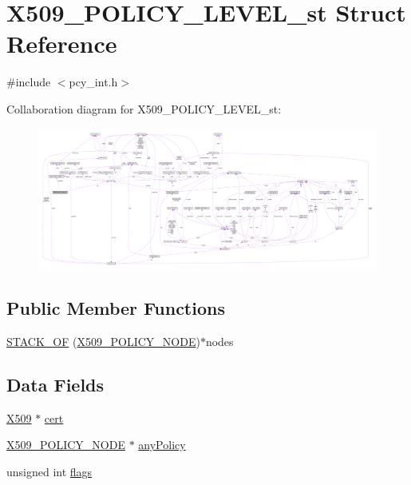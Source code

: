 \hypertarget{struct_x509___p_o_l_i_c_y___l_e_v_e_l__st}{}\section{X509\+\_\+\+P\+O\+L\+I\+C\+Y\+\_\+\+L\+E\+V\+E\+L\+\_\+st Struct Reference}
\label{struct_x509___p_o_l_i_c_y___l_e_v_e_l__st}


{\ttfamily \#include $<$pcy\+\_\+int.\+h$>$}



Collaboration diagram for X509\+\_\+\+P\+O\+L\+I\+C\+Y\+\_\+\+L\+E\+V\+E\+L\+\_\+st\+:\nopagebreak
\begin{figure}[H]
\begin{center}
\leavevmode
\includegraphics[width=350pt]{struct_x509___p_o_l_i_c_y___l_e_v_e_l__st__coll__graph}
\end{center}
\end{figure}
\subsection*{Public Member Functions}
\begin{DoxyCompactItemize}
\item 
\hyperlink{struct_x509___p_o_l_i_c_y___l_e_v_e_l__st_a72aa1cde85ddc679aa0575691af34e87}{S\+T\+A\+C\+K\+\_\+\+OF} (\hyperlink{crypto_2ossl__typ_8h_a4fbb35756a73b47a3c4c86b5a6869f4d}{X509\+\_\+\+P\+O\+L\+I\+C\+Y\+\_\+\+N\+O\+DE})$\ast$nodes
\end{DoxyCompactItemize}
\subsection*{Data Fields}
\begin{DoxyCompactItemize}
\item 
\hyperlink{crypto_2ossl__typ_8h_a4f666bde6518f95deb3050c54b408416}{X509} $\ast$ \hyperlink{struct_x509___p_o_l_i_c_y___l_e_v_e_l__st_a306652fb0d329318991ce0d1b9040bc8}{cert}
\item 
\hyperlink{crypto_2ossl__typ_8h_a4fbb35756a73b47a3c4c86b5a6869f4d}{X509\+\_\+\+P\+O\+L\+I\+C\+Y\+\_\+\+N\+O\+DE} $\ast$ \hyperlink{struct_x509___p_o_l_i_c_y___l_e_v_e_l__st_abef2a24d89a8c82c45f24b97f5fd9979}{any\+Policy}
\item 
unsigned int \hyperlink{struct_x509___p_o_l_i_c_y___l_e_v_e_l__st_ac92588540e8c1d014a08cd8a45462b19}{flags}
\end{DoxyCompactItemize}


